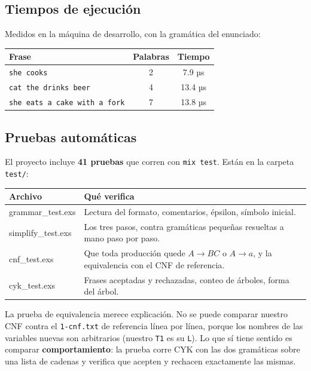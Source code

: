 \documentclass[11pt,a4paper]{article}
\newcommand{\gram}[1]{\texttt{#1}}
\begin{document}
\subsection{Tiempos de ejecución}

Medidos en la máquina de desarrollo, con la gramática del enunciado:

\begin{center}
\begin{tabular}{@{}lcc@{}}
\toprule
\textbf{Frase} & \textbf{Palabras} & \textbf{Tiempo} \\
\midrule
\texttt{she cooks}                   & 2 & 7.9 µs \\
\texttt{cat the drinks beer}         & 4 & 13.4 µs \\
\texttt{she eats a cake with a fork} & 7 & 13.8 µs \\
\bottomrule
\end{tabular}
\end{center}

\subsection{Pruebas automáticas}

El proyecto incluye \textbf{41 pruebas} que corren con \texttt{mix test}.
Están en la carpeta \texttt{test/}:

\begin{center}
\begin{tabular}{@{}>{\ttfamily}l p{8cm}@{}}
\toprule
\textrm{\textbf{Archivo}} & \textbf{Qué verifica} \\
\midrule
grammar\_test.exs  & Lectura del formato, comentarios, épsilon, símbolo inicial. \\
simplify\_test.exs & Los tres pasos, contra gramáticas pequeñas resueltas a mano paso por paso. \\
cnf\_test.exs      & Que toda producción quede $A \to BC$ o $A \to a$, y la equivalencia con el CNF de referencia. \\
cyk\_test.exs      & Frases aceptadas y rechazadas, conteo de árboles, forma del árbol. \\
\bottomrule
\end{tabular}
\end{center}

La prueba de equivalencia merece explicación. No se puede comparar nuestro CNF
contra el \texttt{1-cnf.txt} de referencia línea por línea, porque los nombres de
las variables nuevas son arbitrarios (nuestro \gram{T1} es su \gram{L}). Lo
que sí tiene sentido es comparar \textbf{comportamiento}: la prueba corre CYK
con las dos gramáticas sobre una lista de cadenas y verifica que acepten y
rechacen exactamente las mismas.
\end{document}
